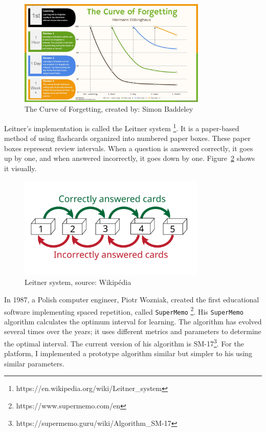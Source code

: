 \begin{figure}[!h]
  \centering
  \includegraphics[width=0.8\textwidth, keepaspectratio]{figures/forgetting_curve}
  \caption{The Curve of Forgetting, created by: Simon Baddeley}
  \label{fig:forgetting-curve}
\end{figure}

Leitner's implementation is called the Leitner system \footnote{https://en.wikipedia.org/wiki/Leitner_system}. It is a paper-based method of using flashcards organized into numbered paper boxes. These paper boxes represent review intervals. When a question is answered correctly, it goes up by one, and when answered incorrectly, it goes down by one. Figure~\ref{fig:leitner-system} shows it visually.

\begin{figure}[!h]
  \centering
  \includegraphics[width=0.8\textwidth, keepaspectratio]{figures/Leitner_system}
  \caption{Leitner system, source: Wikipédia}
  \label{fig:leitner-system}
\end{figure}

In 1987, a Polish computer engineer, Piotr Wozniak, created the first educational software implementing spaced repetition, called \texttt{SuperMemo} \footnote{https://www.supermemo.com/en}. His \texttt{SuperMemo} algorithm calculates the optimum interval for learning. The algorithm has evolved several times over the years; it uses different metrics and parameters to determine the optimal interval. The current version of his algorithm is SM-17\footnote{https://supermemo.guru/wiki/Algorithm_SM-17}. For the platform, I implemented a prototype algorithm similar but simpler to his using similar parameters.


